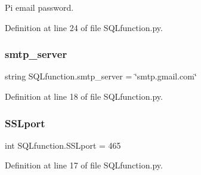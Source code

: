 Pi email password. 



Definition at line 24 of file S\+Q\+Lfunction.\+py.

\mbox{\label{namespace_s_q_lfunction_afc238002d1e4aeb7f8d2e10d47dfad36}} 
\subsubsection{\texorpdfstring{smtp\+\_\+server}{smtp\_server}}
{\footnotesize\ttfamily string S\+Q\+Lfunction.\+smtp\+\_\+server = \char`\"{}smtp.\+gmail.\+com\char`\"{}}



Definition at line 18 of file S\+Q\+Lfunction.\+py.

\mbox{\label{namespace_s_q_lfunction_a700c01c62cb7f1ed2561f5e640da46cf}} 
\subsubsection{\texorpdfstring{S\+S\+Lport}{SSLport}}
{\footnotesize\ttfamily int S\+Q\+Lfunction.\+S\+S\+Lport = 465}



Definition at line 17 of file S\+Q\+Lfunction.\+py.

